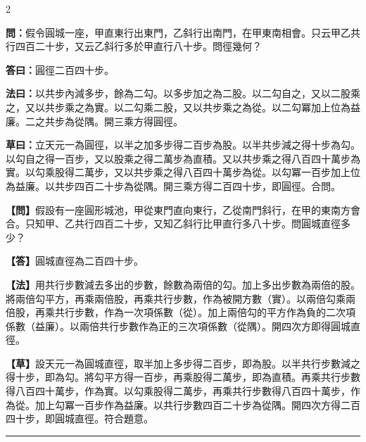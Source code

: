 \documentclass[11pt,a4paper]{article}
\newcommand{\longline}{\noindent\rule{\textwidth}{0.4pt}}
\newcommand{\wenC}[1]{\par\noindent\textbf{\textcolor{probcolor}{問：}}{#1}\par}
\newcommand{\daC}[1]{\par\noindent\textbf{\textcolor{anscolor}{答曰：}}{#1}\par}
\newcommand{\fayueC}[1]{\par\noindent\textbf{\textcolor{methodcolor}{法曰：}}{#1}\par}
\newcommand{\caoyueC}[1]{\par\noindent\textbf{草曰：}{#1}\par}
\newcommand{\wenM}[1]{\par\noindent\textbf{\textcolor{probcolor}{【問】}}{#1}\par}
\newcommand{\daM}[1]{\par\noindent\textbf{\textcolor{anscolor}{【答】}}{#1}\par}
\newcommand{\fayueM}[1]{\par\noindent\textbf{\textcolor{methodcolor}{【法】}}{#1}\par}
\newcommand{\caoyueM}[1]{\par\noindent\textbf{【草】}{#1}\par}
\begin{document}
\begin{paracol}{2}

\wenC{假令圓城一座，甲直東行出東門，乙斜行出南門，在甲東南相會。只云甲乙共行四百二十步，又云乙斜行多於甲直行八十步。問徑幾何？}

\daC{圓徑二百四十步。}

\fayueC{以共步內減多步，餘為二勾。以多步加之為二股。以二勾自之，又以二股乘之，又以共步乘之為實。以二勾乘二股，又以共步乘之為從。以二勾冪加上位為益廉。二之共步為從隅。開三乘方得圓徑。}

\caoyueC{立天元一為圓徑，以半之加多步得二百步為股。以半共步減之得十步為勾。以勾自之得一百步，又以股乘之得二萬步為直積。又以共步乘之得八百四十萬步為實。以勾乘股得二萬步，又以共步乘之得八百四十萬步為從。以勾冪一百步加上位為益廉。以共步四百二十步為從隅。開三乘方得二百四十步，即圓徑。合問。}

\switchcolumn

\wenM{假設有一座圓形城池，甲從東門直向東行，乙從南門斜行，在甲的東南方會合。只知甲、乙共行四百二十步，又知乙斜行比甲直行多八十步。問圓城直徑多少？}

\daM{圓城直徑為二百四十步。}

\fayueM{用共行步數減去多出的步數，餘數為兩倍的勾。加上多出步數為兩倍的股。將兩倍勾平方，再乘兩倍股，再乘共行步數，作為被開方數（實）。以兩倍勾乘兩倍股，再乘共行步數，作為一次項係數（從）。加上兩倍勾的平方作為負的二次項係數（益廉）。以兩倍共行步數作為正的三次項係數（從隅）。開四次方即得圓城直徑。}

\caoyueM{設天元一為圓城直徑，取半加上多步得二百步，即為股。以半共行步數減之得十步，即為勾。將勾平方得一百步，再乘股得二萬步，即為直積。再乘共行步數得八百四十萬步，作為實。以勾乘股得二萬步，再乘共行步數得八百四十萬步，作為從。加上勾冪一百步作為益廉。以共行步數四百二十步為從隅。開四次方得二百四十步，即圓城直徑。符合題意。}

\end{paracol}

\vspace{0.3cm}
\longline
\end{document}
